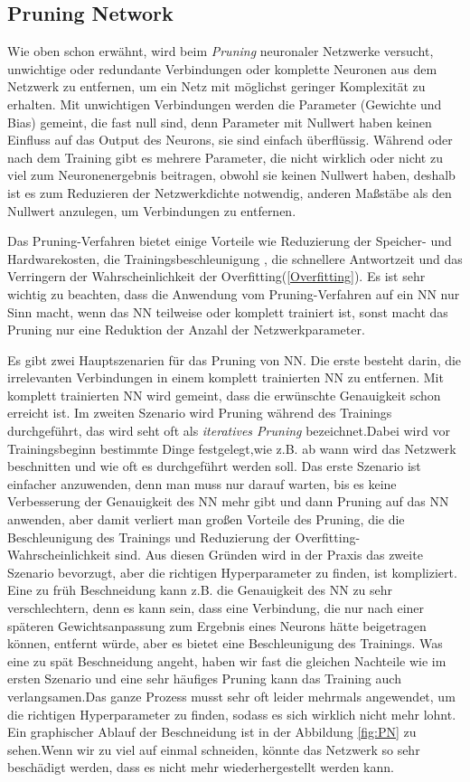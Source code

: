 \documentclass[12pt,a4paper]{scrartcl}
\numberwithin{equation}{section}
\begin{document}
\subsection{Pruning Network}
Wie oben schon erwähnt, wird beim \textit{Pruning} neuronaler Netzwerke versucht, unwichtige oder redundante Verbindungen oder komplette Neuronen aus dem Netzwerk zu entfernen, um ein Netz mit möglichst geringer Komplexität zu erhalten. Mit unwichtigen Verbindungen werden die Parameter (Gewichte und Bias) gemeint, die fast null sind, denn Parameter mit Nullwert haben keinen Einfluss auf das Output des Neurons, sie sind einfach überflüssig. Während oder nach dem Training gibt es mehrere Parameter, die nicht wirklich oder nicht zu viel zum Neuronenergebnis beitragen, obwohl sie keinen Nullwert haben, deshalb ist es zum Reduzieren der Netzwerkdichte notwendig, anderen Maßstäbe als den Nullwert anzulegen, um Verbindungen zu entfernen.

Das Pruning-Verfahren bietet einige Vorteile wie Reduzierung der Speicher- und Hardwarekosten, die Trainingsbeschleunigung , die schnellere Antwortzeit und das Verringern der Wahrscheinlichkeit der Overfitting(\ref{Overfitting}).
Es ist sehr wichtig zu beachten, dass die Anwendung vom Pruning-Verfahren auf ein \ac{NN} nur Sinn macht, wenn das \ac{NN} teilweise oder komplett trainiert ist, sonst macht das Pruning nur eine Reduktion der Anzahl der Netzwerkparameter.

Es gibt zwei Hauptszenarien für das Pruning von \ac{NN}.
Die erste besteht darin, die irrelevanten Verbindungen in einem komplett trainierten \ac{NN} zu entfernen. Mit komplett trainierten \ac{NN} wird gemeint, dass die erwünschte Genauigkeit schon erreicht ist. Im zweiten Szenario wird Pruning während des Trainings durchgeführt, das wird seht oft als \textit{iteratives Pruning} bezeichnet.Dabei wird vor Trainingsbeginn  bestimmte Dinge festgelegt,wie z.B. ab wann wird das Netzwerk beschnitten und wie oft es durchgeführt werden soll. 
Das erste Szenario ist einfacher anzuwenden, denn man muss nur darauf warten, bis es keine Verbesserung der Genauigkeit des \ac{NN} mehr gibt und dann Pruning auf das \ac{NN} anwenden, aber damit verliert man großen Vorteile des Pruning, die die Beschleunigung des Trainings und Reduzierung der Overfitting-Wahrscheinlichkeit sind.
Aus diesen Gründen wird in der Praxis das zweite Szenario bevorzugt, aber die richtigen Hyperparameter zu finden, ist kompliziert. Eine zu früh Beschneidung kann z.B. die Genauigkeit des \ac{NN} zu sehr verschlechtern, denn es kann sein, dass eine Verbindung, die nur nach einer späteren Gewichtsanpassung zum Ergebnis eines Neurons  hätte beigetragen können, entfernt würde, aber es bietet eine Beschleunigung des Trainings. Was eine zu spät Beschneidung angeht, haben wir fast die gleichen Nachteile wie im ersten Szenario und eine sehr häufiges Pruning kann das Training  auch verlangsamen.Das ganze Prozess musst sehr oft leider mehrmals angewendet, um die richtigen Hyperparameter zu finden, sodass es sich wirklich nicht mehr lohnt. Ein graphischer Ablauf der Beschneidung ist in der Abbildung \ref{fig:PN} zu sehen.Wenn wir zu viel auf einmal schneiden, könnte das Netzwerk so sehr beschädigt werden, dass es nicht mehr wiederhergestellt werden kann.
\end{document}
